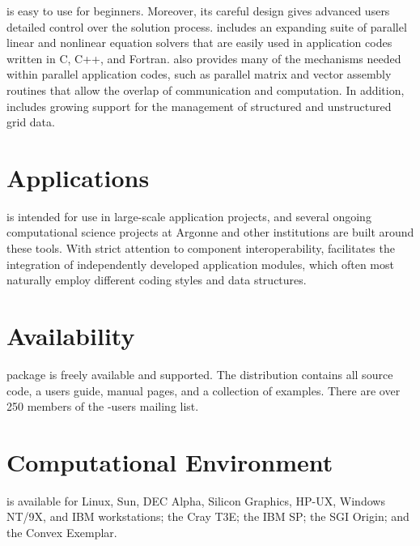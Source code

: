  is easy to use for beginners.  Moreover, its careful
design gives advanced users detailed control over the
solution process.  includes an expanding suite of parallel
linear and nonlinear equation solvers that are easily used in
application codes written in C, C++, and Fortran.   also
provides many of the mechanisms needed within parallel application
codes, such as parallel matrix and vector assembly routines
that allow the overlap of communication and computation.  In addition,
 includes growing support for the management of structured and
unstructured grid data.
\vsp

\section*{Applications}
 is intended for use in large-scale application projects, and
several ongoing computational science projects at Argonne
and other institutions are built around these tools.
With strict attention to component interoperability, 
facilitates the integration of independently developed application
modules, which often most naturally employ different coding styles and
data structures. 

\section*{Availability}

 package is freely available and supported.
The  distribution contains all source code, 
a users guide, manual pages, and a
collection of examples. There are over 250 members of the -users mailing list.

\section*{Computational Environment}
 is available for Linux, Sun, DEC Alpha, Silicon Graphics, HP-UX, Windows NT/9X, 
and IBM workstations; the Cray T3E; the IBM SP; the SGI Origin; and the Convex Exemplar.

\vspace{-.1cm}
\makeinfo

